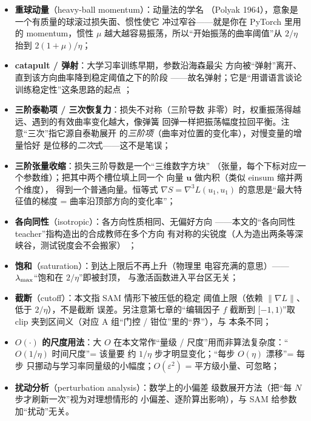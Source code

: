\begin{itemize}
  \item \textbf{重球动量}（heavy-ball momentum）：动量法的学名
        （Polyak 1964），意象是一个有质量的球滚过损失面、惯性使它
        冲过窄谷——就是你在 PyTorch 里用的 momentum，惯性 $\mu$
        越大越容易振荡，所以``开始振荡的曲率阈值''从 $2/\eta$
        抬到 $2(1{+}\mu)/\eta$；
  \item \textbf{catapult / 弹射}：大学习率训练早期，参数沿海森最尖
        方向被``弹射''离开、直到该方向曲率降到稳定阈值之下的阶段
        ——故名弹射；它是``用谱语言谈论训练稳定性''这条思路的起点
        ；
  \item \textbf{三阶泰勒项 / 三次恢复力}：损失不对称（三阶导数
        非零）时，权重振荡得越远、遇到的有效曲率变化越大，像弹簧
        回弹一样把振荡幅度拉回平衡。注意``三次''指它源自泰勒展开
        的\emph{三阶项}（曲率对位置的变化率），对慢变量的增量恰好
        是位移的\emph{二次}式——这不是笔误；
  \item \textbf{三阶张量收缩}：损失三阶导数是一个``三维数字方块''
        （张量，每个下标对应一个参数维）；把其中两个槽位填上同一个
        向量 $\mathbf{u}$ 做内积（类似 einsum 缩并两个维度），
        得到一个普通向量。恒等式 $\nabla S=\nabla^{3}L(u_1,u_1)$
        的意思是``最大特征值的梯度 = 曲率沿顶部方向的变化率''；
  \item \textbf{各向同性}（isotropic）：各方向性质相同、无偏好方向
        ——本文的``各向同性 teacher''指构造出的合成教师在多个方向
        有对称的尖锐度（人为造出两条等深峡谷，测试锐度会不会搬家）
        ；
  \item \textbf{饱和}（saturation）：到达上限后不再上升（物理里
        电容充满的意思）——$\lambda_{\max}$``饱和在 $2/\eta$''即被封顶，
        与激活函数进入平台区无关；
  \item \textbf{截断}（cutoff）：本文指 SAM 情形下被压低的稳定
        阈值上限（依赖 $\|\nabla L\|$、低于 $2/\eta$），不是截断
        误差。另注意第七章的``编辑因子 $f$ 截断到 $[-1,1)$''取
        clip 夹到区间义（对应 A 组``门控 / 钳位''里的``界''），与
        本条不同；
  \item \textbf{$O(\cdot)$ 的尺度用法}：大 $O$ 在本文常作``量级 /
        尺度''用而非算法复杂度：``$O(1/\eta)$ 时间尺度''= 该量要
        约 $1/\eta$ 步才明显变化；``每步 $O(\eta)$ 漂移''= 每步
        只挪动与学习率同量级的小幅度；$O(\varepsilon^{2})$ =
        平方级小量、可忽略；
  \item \textbf{扰动分析}（perturbation analysis）：数学上的小偏差
        级数展开方法（把``每 $N$ 步才刷新一次''视为对理想情形的
        小偏差、逐阶算出影响），与 SAM 给参数加``扰动''无关。
\end{itemize}


